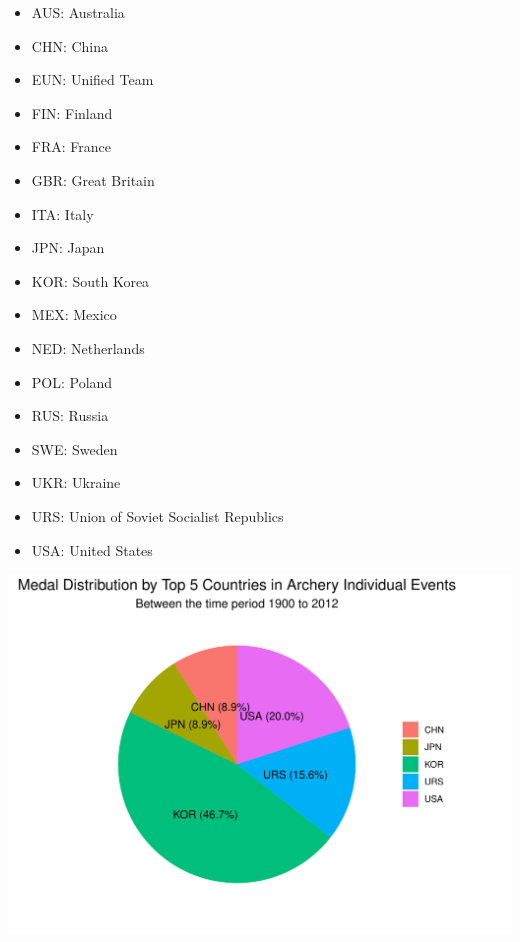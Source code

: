 \documentclass[12pt,preprint, authoryear]{elsarticle}
\let\origfigure\figure
\let\endorigfigure\endfigure
\renewenvironment{figure}[1][2] {
    \expandafter\origfigure\expandafter[H]
} {
    \endorigfigure
}
\numberwithin{equation}{section}
\numberwithin{figure}{section}
\numberwithin{table}{section}
\def\tightlist{} %
\begin{document}
\begin{itemize}
\tightlist
\item
  AUS: Australia
\item
  CHN: China
\item
  EUN: Unified Team
\item
  FIN: Finland
\item
  FRA: France
\item
  GBR: Great Britain
\item
  ITA: Italy
\item
  JPN: Japan
\item
  KOR: South Korea
\item
  MEX: Mexico
\item
  NED: Netherlands
\item
  POL: Poland
\item
  RUS: Russia
\item
  SWE: Sweden
\item
  UKR: Ukraine
\item
  URS: Union of Soviet Socialist Republics
\item
  USA: United States
\end{itemize}

\begin{figure}

{\centering \includegraphics{README_files/figure-latex/unnamed-chunk-5-1} 

}

\caption{A Pie Chart showcasing the Distibution of Medal Winnings by the Top 5 Countries in Individual Archery Events\label{Figure5}}\label{fig:unnamed-chunk-5}
\end{figure}
\end{document}
